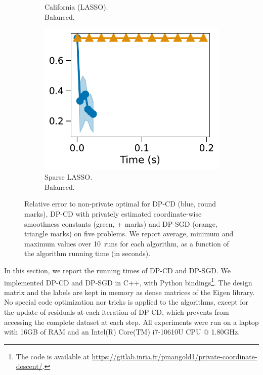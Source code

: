 \begin{figure}[t]
\begin{subfigure}{0.3\linewidth}
    \caption{California (LASSO).\\ Balanced.}
    \label{fig:expe-time-california-norm}
  \end{subfigure}
  \begin{subfigure}{0.3\linewidth}
    \centering
    \includegraphics[width=\linewidth]{plots/time_optimization_lasso.pdf}
    \caption{Sparse LASSO.\\ Balanced.}
    \label{fig:expe-time-lasso}
  \end{subfigure}


  \caption{Relative error to non-private optimal for DP-CD (blue,
    round marks), DP-CD with privately estimated coordinate-wise smoothness
    constants (green, + marks) and DP-SGD (orange, triangle marks) on
    five problems. We report average, minimum and maximum values over
    10~runs for each algorithm, as a function of the algorithm running
    time (in seconds).  }
  \label{fig:expe-time}
\end{figure}


In this section, we report the running times of DP-CD and DP-SGD.  We
implemented DP-CD and DP-SGD in C++, with Python bindings\footnote{The
  code is available at
  \url{https://gitlab.inria.fr/pmangold1/private-coordinate-descent/}.}. The
design matrix and the labels are kept in memory as dense matrices of
the Eigen library. No special code optimization nor tricks is applied
to the algorithms, except for the update of residuals at each
iteration of DP-CD, which prevents from accessing the complete dataset
at each step. All experiments were run on a laptop with 16GB of RAM
and an Intel(R) Core(TM) i7-10610U CPU @ 1.80GHz.

